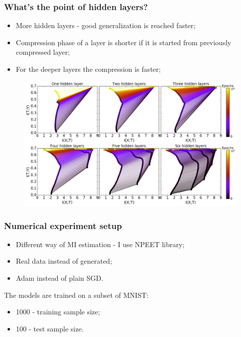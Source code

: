 \documentclass[11pt,xcolor=x11names,compress]{beamer}
\renewcommand{\(}{\begin{columns}}
\renewcommand{\)}{\end{columns}}
\newcommand{\<}[1]{\begin{column}{#1}}
\renewcommand{\>}{\end{column}}
\begin{document}
\begin{frame}
	\frametitle{What's the point of hidden layers?}
	\tiny
	\begin{itemize}
		\item More hidden layers - good generalization is reached faster;
		\item Compression phase of a layer is shorter if it is started from previously compressed layer;
		\item For the deeper layers the compression is faster;
	\end{itemize}
	\begin{figure}
		\includegraphics[width=\textwidth]{InformationPaths.png}
	\end{figure}
\end{frame}

\begin{frame}
	\frametitle{Numerical experiment setup}
	\begin{itemize}
		\item Different way of MI estimation - I use NPEET library;
		\item Real data instead of generated;
		\item Adam instead of plain SGD.
	\end{itemize}
	The models are trained on a subset of MNIST:
	\begin{itemize}
		\item 1000 - training sample size;
		\item 100 - test sample size.
	\end{itemize}
\end{frame}
\end{document}
